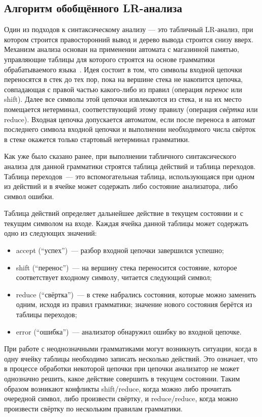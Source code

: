 \subsection{Алгоритм обобщённого LR-анализа}

Один из подходов к синтаксическому анализу --- это табличный LR-анализ, при котором строится правосторонний вывод и дерево вывода строится снизу вверх. Механизм анализа основан на применении автомата с магазинной памятью, управляющие таблицы для которого строятся на основе грамматики обрабатываемого языка~\cite{Grune}. Идея состоит в том, что символы входной цепочки переносятся в стек до тех пор, пока на вершине стека не накопится цепочка, совпадающая с правой частью какого-либо из правил (операция \textit{перенос} или shift). Далее все символы этой цепочки извлекаются из стека, и на их место помещается нетерминал, соответствующий этому правилу (операция \textit{свёртка} или  reduce). Входная цепочка допускается автоматом, если после переноса в автомат последнего символа входной цепочки и выполнении необходимого числа свёрток в стеке окажется только стартовый нетерминал грамматики.

Как уже было сказано ранее, при выполнении табличного синтаксического анализа для данной грамматики строятся таблица действий и таблица переходов. Таблица переходов~--- это вспомогательная таблица, использующаяся при одном из действий и в ячейке может содержать либо состояние анализатора, либо символ ошибки.

Таблица действий определяет дальнейшее действие в текущем состоянии и с текущим символом на входе. Каждая ячейка данной таблицы может содержать одно из следующих значений:
\begin{itemize}
    \item accept (``успех'')~--- разбор входной цепочки завершился успешно;
    \item shift (``перенос'')~--- на вершину стека переносится состояние, которое соответствует входному символу, читается следующий символ;
    \item reduce (``свёртка'')~--- в стеке набрались состояния, которые можно заменить одним, исходя из правил грамматики; значение нового состояния берётся из таблицы переходов;
    \item error (``ошибка'')~--- анализатор обнаружил ошибку во входной цепочке.
\end{itemize}

При работе с неоднозначными грамматиками могут возникнуть ситуации, когда в одну ячейку таблицы необходимо записать несколько действий. Это означает, что в процессе обработки некоторой цепочки при цепочки анализатор не может однозначно решить, какое действие совершить в текущем состоянии. Таким образом возникают конфликты shift/reduce, когда можно либо прочитать очередной символ, либо произвести свёртку, и reduce/reduce, когда можно произвести свёртку по нескольким правилам грамматики.

